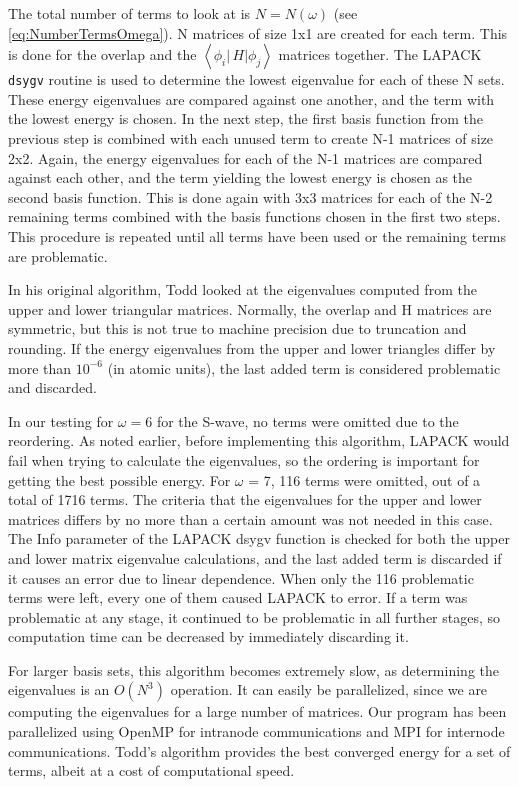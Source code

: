 \documentclass[Dissertation.tex]{subfiles}
\begin{document}
The total number of terms to look at is $N = N(\omega)$ (see \cref{eq:NumberTermsOmega}).
N matrices of size 1x1 are created for each term. This 
is done for the overlap and the
$\left\langle \phi_i \left| \,H \right| \phi_j \right\rangle$
matrices together. The LAPACK \texttt{dsygv} routine is used to 
determine the lowest eigenvalue for each of these N sets. These energy 
eigenvalues are compared against one another, and the term with the lowest 
energy is chosen. In the next step, the first basis function from the 
previous step is combined with each unused term to create N-1 matrices of 
size 2x2. Again, the energy eigenvalues for each of the N-1 matrices are 
compared against each other, and the term yielding the lowest energy is 
chosen as the second basis function. This is done again with 3x3 matrices for 
each of the N-2 remaining terms combined with the basis functions chosen in 
the first two steps. This procedure is repeated until all terms have been 
used or the remaining terms are problematic.

In his original algorithm, Todd looked at the eigenvalues computed from 
the upper and lower triangular matrices. Normally, the overlap and H matrices 
are symmetric, but this is not true to machine precision due to truncation 
and rounding. If the energy eigenvalues from the upper and lower triangles 
differ by more than $10^{-6}$ (in atomic units), the last added term is 
considered problematic and discarded.

In our testing for $\omega = 6$ for the S-wave, no terms were omitted due to the reordering. 
As noted earlier, before implementing this algorithm, LAPACK would fail when 
trying to calculate the eigenvalues, so the ordering is important for getting 
the best possible energy. For $\omega$ = 7, 116 terms were omitted, out of a 
total of 1716 terms. The criteria that the eigenvalues for the upper and 
lower matrices differs by no more than a certain amount was not needed in 
this case. The Info parameter of the LAPACK dsygv function is checked for 
both the upper and lower matrix eigenvalue calculations, and the last added 
term is discarded if it causes an error due to linear dependence. When only 
the 116 problematic terms were left, every one of them caused LAPACK to 
error. If a term was problematic at any stage, it continued to be problematic 
in all further stages, so computation time can be decreased by immediately 
discarding it.

For larger basis sets, this algorithm becomes extremely slow, as determining 
the eigenvalues is an $O(N^3)$ operation. It can easily be parallelized, 
since we are computing the eigenvalues for a large number of matrices. Our 
program has been parallelized using OpenMP \cite{OpenMP} for intranode
communications and MPI \cite{MPI} for internode communications. Todd's
algorithm provides the best converged energy for a set of terms, albeit
at a cost of computational speed.
\end{document}
